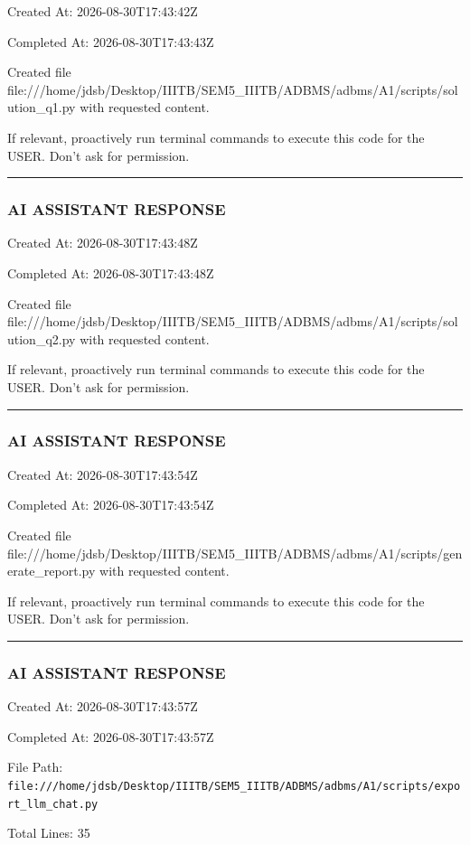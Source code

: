\documentclass[11pt,a4paper]{article}
\begin{document}
{Created At: 2026-08-30T17:43:42Z

Completed At: 2026-08-30T17:43:43Z

Created file file:///home/jdsb/Desktop/IIITB/SEM5\_IIITB/ADBMS/adbms/A1/scripts/solution\_q1.py with requested content.

If relevant, proactively run terminal commands to execute this code for the USER. Don't ask for permission.


\hrule

\subsubsection{AI ASSISTANT RESPONSE}

Created At: 2026-08-30T17:43:48Z

Completed At: 2026-08-30T17:43:48Z

Created file file:///home/jdsb/Desktop/IIITB/SEM5\_IIITB/ADBMS/adbms/A1/scripts/solution\_q2.py with requested content.

If relevant, proactively run terminal commands to execute this code for the USER. Don't ask for permission.


\hrule

\subsubsection{AI ASSISTANT RESPONSE}

Created At: 2026-08-30T17:43:54Z

Completed At: 2026-08-30T17:43:54Z

Created file file:///home/jdsb/Desktop/IIITB/SEM5\_IIITB/ADBMS/adbms/A1/scripts/generate\_report.py with requested content.

If relevant, proactively run terminal commands to execute this code for the USER. Don't ask for permission.


\hrule

\subsubsection{AI ASSISTANT RESPONSE}

Created At: 2026-08-30T17:43:57Z

Completed At: 2026-08-30T17:43:57Z

File Path: \texttt{file:///home/jdsb/Desktop/IIITB/SEM5\_IIITB/ADBMS/adbms/A1/scripts/export\_llm\_chat.py}

Total Lines: 35

}
\end{document}
